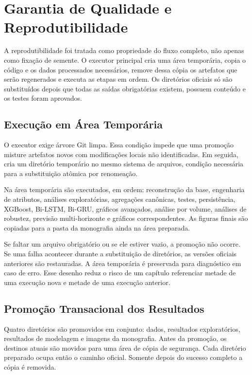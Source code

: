 \section{Garantia de Qualidade e Reprodutibilidade}\label{sec:qualidade_reprodutibilidade}

A reprodutibilidade foi tratada como propriedade do fluxo completo, não apenas como fixação de semente. O executor principal cria uma área temporária, copia o código e os dados processados necessários, remove dessa cópia os artefatos que serão regenerados e executa as etapas em ordem. Os diretórios oficiais só são substituídos depois que todas as saídas obrigatórias existem, possuem conteúdo e os testes foram aprovados.

\subsection{Execução em Área Temporária}

O executor exige árvore Git limpa. Essa condição impede que uma promoção misture artefatos novos com modificações locais não identificadas. Em seguida, cria um diretório temporário no mesmo sistema de arquivos, condição necessária para a substituição atômica por renomeação.

Na área temporária são executados, em ordem: reconstrução da base, engenharia de atributos, análises exploratórias, agregações canônicas, testes, persistência, XGBoost, Bi-LSTM, Bi-GRU, gráficos avançados, análise por volume, análises de robustez, previsão multi-horizonte e gráficos correspondentes. As figuras finais são copiadas para a pasta da monografia ainda na área preparada.

Se faltar um arquivo obrigatório ou se ele estiver vazio, a promoção não ocorre. Se uma falha acontecer durante a substituição de diretórios, as versões oficiais anteriores são restauradas. A área temporária é preservada para diagnóstico em caso de erro. Esse desenho reduz o risco de um capítulo referenciar metade de uma execução nova e metade de uma execução anterior.

\subsection{Promoção Transacional dos Resultados}

Quatro diretórios são promovidos em conjunto: dados, resultados exploratórios, resultados de modelagem e imagens da monografia. Antes da promoção, os destinos atuais são movidos para uma área de cópia de segurança. Cada diretório preparado ocupa então o caminho oficial. Somente depois do sucesso completo a cópia é removida.

